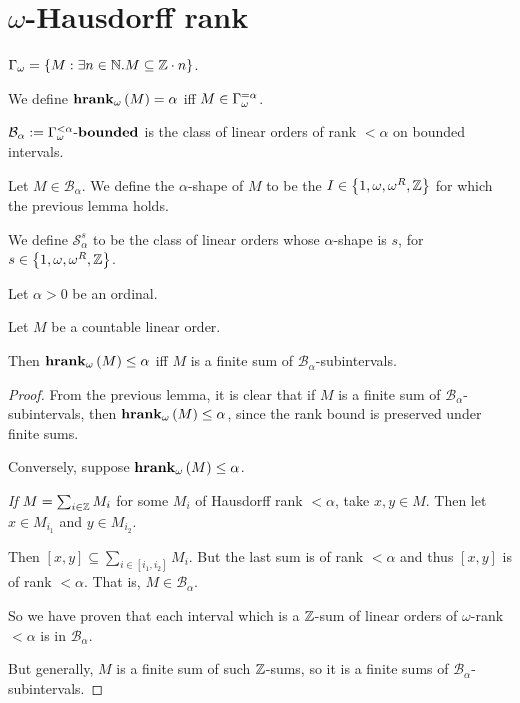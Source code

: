 

\section{$\omega$-Hausdorff rank}

\begin{definitions}
  $\Gamma_{\omega} = \left\{ {M : \exists n \in \mathbb{N} . M \subseteq \mathbb{Z} \cdot n} \right\}$.

  We define $\mathbf{hrank}_{\omega}\left( M \right) = \alpha$ iff $M \in \Gamma_{\omega}^{= \alpha}$.

  $\mathcal{B}_{\alpha} := {\Gamma_{\omega}^{< \alpha}} \text{-} \mathbf{bounded}$ is the class
  of linear orders of rank $< \alpha$ on bounded intervals.
\end{definitions}


\begin{definition}
  Let $M \in \mathcal{B}_{\alpha}$. We define the $\alpha$-shape
  of $M$ to be the $I \in \left\{ {1, \omega, \omega^R, \mathbb{Z}} \right\}$ 
  for which the previous lemma holds.

  We define $\mathcal{S}^{s}_{\alpha}$ to be the class of linear orders
  whose $\alpha$-shape is $s$, for $s \in \left\{ {1, \omega, \omega^R, \mathbb{Z}} \right\}$.
\end{definition}

\begin{lemma}
  Let $\alpha > 0$ be an ordinal.

  Let $M$ be a countable linear order.

  Then $\mathbf{hrank}_{\omega}\left( M \right) \le \alpha$ iff $M$ is a finite sum of $\mathcal{B}_{\alpha}$-subintervals.
\end{lemma}

\begin{proof}
  From the previous lemma, it is clear that if $M$ is a finite sum of $\mathcal{B}_{\alpha}$-subintervals,
  then $\mathbf{hrank}_{\omega}\left( M \right) \le \alpha$, since the rank bound is preserved under finite sums.

  Conversely, suppose $\mathbf{hrank}_{\omega}\left( M \right) \le \alpha$.

  \emph{If} $M = \sum_{i \in \mathbb{Z}} M_i$ for some $M_i$ of Hausdorff rank $< \alpha$,
  take $x, y \in M$. Then let $x \in M_{i_1}$ and $y \in M_{i_2}$.

  Then $[x, y] \subseteq \sum_{i \in [i_1, i_2]} M_i$. But the last sum is of rank $< \alpha$
  and thus $[x, y]$ is of rank $< \alpha$. That is, $M \in \mathcal{B}_{\alpha}$.

  So we have proven that each interval which is a $\mathbb{Z}$-sum of linear orders of
  $\omega$-rank $< \alpha$ is in $\mathcal{B}_{\alpha}$.

  But generally, $M$ is a finite sum of such $\mathbb{Z}$-sums, so it is a finite sums
  of $\mathcal{B}_{\alpha}$-subintervals.
\end{proof}

